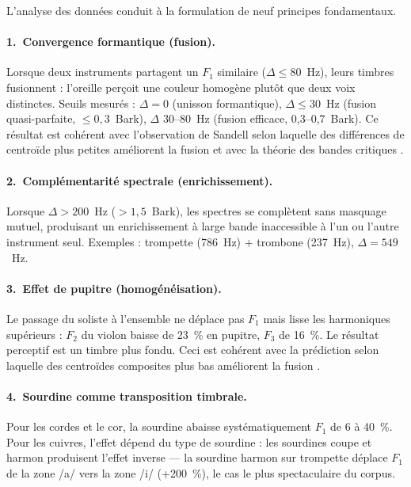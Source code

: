 \documentclass[12pt,a4paper]{article}
\begin{document}
L'analyse des données conduit à la formulation de neuf principes fondamentaux.

\paragraph{1.\ Convergence formantique (fusion).}
Lorsque deux instruments partagent un $F_1$ similaire ($\Delta \leq 80$~Hz), leurs
timbres fusionnent : l'oreille perçoit une couleur homogène plutôt que deux voix
distinctes. Seuils mesurés : $\Delta = 0$ (unisson formantique), $\Delta \leq 30$~Hz
(fusion quasi-parfaite, $\leq 0,3$~Bark), $\Delta$ 30--80~Hz (fusion efficace,
0,3--0,7~Bark). Ce résultat est cohérent avec l'observation de Sandell selon laquelle
des différences de centroïde plus petites améliorent la fusion \citep{Sandell1995} et
avec la théorie des bandes critiques \citep{Zwicker1961}.

\paragraph{2.\ Complémentarité spectrale (enrichissement).}
Lorsque $\Delta > 200$~Hz ($> 1,5$~Bark), les spectres se complètent sans masquage
mutuel, produisant un enrichissement à large bande inaccessible à l'un ou l'autre
instrument seul. Exemples : trompette (786~Hz) + trombone (237~Hz), $\Delta = 549$~Hz.

\paragraph{3.\ Effet de pupitre (homogénéisation).}
Le passage du soliste à l'ensemble ne déplace pas $F_1$ mais lisse les harmoniques
supérieurs : $F_2$ du violon baisse de 23~\% en pupitre, $F_3$ de 16~\%. Le résultat
perceptif est un timbre plus fondu. Ceci est cohérent avec la prédiction selon laquelle
des centroïdes composites plus bas améliorent la fusion \citep{Sandell1995}.

\paragraph{4.\ Sourdine comme transposition timbrale.}
Pour les cordes et le cor, la sourdine abaisse systématiquement $F_1$ de 6 à 40~\%.
Pour les cuivres, l'effet dépend du type de sourdine : les sourdines coupe et harmon
produisent l'effet inverse --- la sourdine harmon sur trompette déplace $F_1$ de la
zone /a/ vers la zone /i/ (+200~\%), le cas le plus spectaculaire du corpus.
\end{document}

